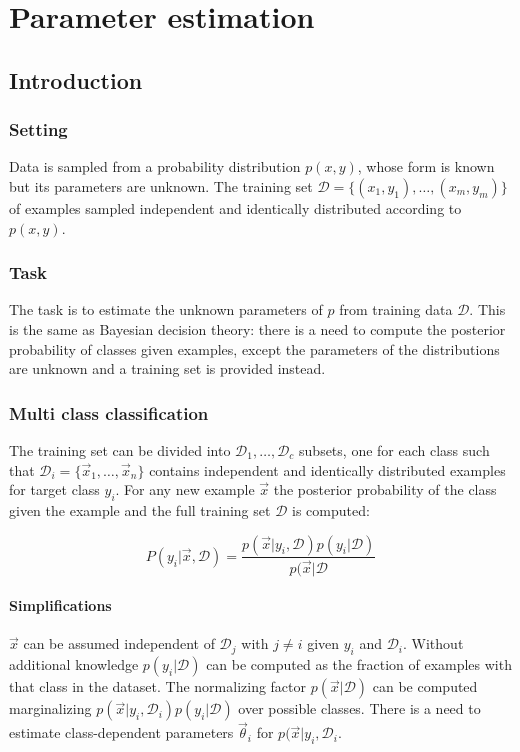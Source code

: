 \chapter{Parameter estimation}

\section{Introduction}

	\subsection{Setting}
	Data is sampled from a probability distribution $p(x, y)$, whose form is known but its parameters are unknown.
	The training set $\mathcal{D} = \{(x_1, y_1), \dots, (x_m, y_m)\}$ of examples sampled independent and identically distributed according to $p(x,y)$.

	\subsection{Task}
	The task is to estimate the unknown parameters of $p$ from training data $\mathcal{D}$.
	This is the same as Bayesian decision theory: there is a need to compute the posterior probability of classes given examples, except the parameters of the distributions are unknown and a training set is provided instead.

	\subsection{Multi class classification}
	The training set can be divided into $\mathcal{D}_1, \dots, \mathcal{D}_c$ subsets, one for each class such that $\mathcal{D}_i = \{\vec{x}_1, \dots, \vec{x}_n\}$ contains independent and identically distributed examples for target class $y_i$.
	For any new example $\vec{x}$ the posterior probability of the class given the example and the full training set $\mathcal{D}$ is computed:

	$$P(y_i|\vec{x}, \mathcal{D}) = \frac{p(\vec{x}|y_i, \mathcal{D})p(y_i|\mathcal{D})}{p(\vec{x}|\mathcal{D}}$$

		\subsubsection{Simplifications}
		$\vec{x}$ can be assumed independent of $\mathcal{D}_j$ with $j\neq i$ given $y_i$ and $\mathcal{D}_i$.
		Without additional knowledge $p(y_i|\mathcal{D})$ can be computed as the fraction of examples with that class in the dataset.
		The normalizing factor $p(\vec{x}|\mathcal{D})$ can be computed marginalizing $p(\vec{x}|y_i, \mathcal{D}_i)p(y_i|\mathcal{D})$ over possible classes.
		There is a need to estimate class-dependent parameters $\vec{\theta}_i$ for $p(\vec{x}|y_i, \mathcal{D}_i$.

